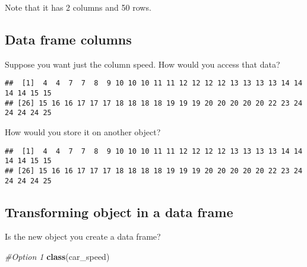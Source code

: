 \documentclass[
]{article}
\newenvironment{Shaded}{\begin{snugshade}}{\end{snugshade}}
\newcommand{\CommentTok}[1]{\textcolor[rgb]{0.56,0.35,0.01}{\textit{#1}}}
\newcommand{\KeywordTok}[1]{\textcolor[rgb]{0.13,0.29,0.53}{\textbf{#1}}}
\newcommand{\NormalTok}[1]{#1}
\newcommand{\OperatorTok}[1]{\textcolor[rgb]{0.81,0.36,0.00}{\textbf{#1}}}
\newcommand{\StringTok}[1]{\textcolor[rgb]{0.31,0.60,0.02}{#1}}
\begin{document}
Note that it has 2 columns and 50 rows.

\hypertarget{data-frame-columns}{%
\subsection{Data frame columns}\label{data-frame-columns}}

Suppose you want just the column speed. How would you access that data?

\begin{Shaded}
\end{Shaded}

\begin{verbatim}
##  [1]  4  4  7  7  8  9 10 10 10 11 11 12 12 12 12 13 13 13 13 14 14 14 14 15 15
## [26] 15 16 16 17 17 17 18 18 18 18 19 19 19 20 20 20 20 20 22 23 24 24 24 24 25
\end{verbatim}

How would you store it on another object?

\begin{Shaded}
\end{Shaded}

\begin{verbatim}
##  [1]  4  4  7  7  8  9 10 10 10 11 11 12 12 12 12 13 13 13 13 14 14 14 14 15 15
## [26] 15 16 16 17 17 17 18 18 18 18 19 19 19 20 20 20 20 20 22 23 24 24 24 24 25
\end{verbatim}

\hypertarget{transforming-object-in-a-data-frame}{%
\subsection{Transforming object in a data
frame}\label{transforming-object-in-a-data-frame}}

Is the new object you create a data frame?

\begin{Shaded}
\begin{Highlighting}[]
\CommentTok{#Option 1}
\KeywordTok{class}\NormalTok{(car_speed)}
\end{Highlighting}
\end{Shaded}
\end{document}
